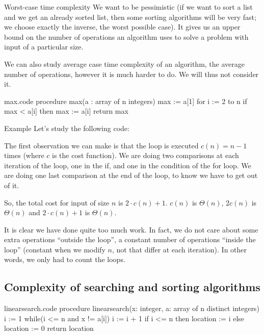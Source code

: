 \documentclass[a4paper]{article}
\begin{document}
\begin{parag}{Worst-case time complexity}
    We want to be pessimistic (if we want to sort a list and we get an already sorted list, then some sorting algorithms will be very fast; we choose exactly the inverse, the worst possible case). It gives us an upper bound on the number of operations an algorithm uses to solve a problem with input of a particular size.

    We can also study average case time complexity of an algorithm, the average number of operations, however it is much harder to do. We will thus not consider it.
\end{parag}

\begin{filecontents*}[overwrite]{max.code}
procedure max(a : array of n integers)
    max := a[1]
    for i := 2 to n
        if max < a[i] then max := a[i]
    return max
\end{filecontents*}

\begin{parag}{Example}
    Let's study the following code:

    The first observation we can make is that the loop is executed $c\left(n\right) = n - 1$ times (where $c$ is the cost function). We are doing two comparisons at each iteration of the loop, one in the if, and one in the condition of the for loop. We are doing one last comparison at the end of the loop, to know we have to get out of it.

    So, the total cost for input of size $n$ is $2\cdot c\left(n\right) + 1$. $c\left(n\right)$ is $\Theta\left(n\right)$, $2c\left(n\right)$ is $\Theta\left(n\right)$ and $2\cdot c\left(n\right) + 1$ is $\Theta\left(n\right)$.

    It is clear we have done quite too much work. In fact, we do not care about some extra operations ``outside the loop'', a constant number of operations ``inside the loop'' (constant when we modify $n$, not that differ at each iteration). In other words, we only had to count the loops.
\end{parag}

\subsection{Complexity of searching and sorting algorithms}
\begin{filecontents*}[overwrite]{linearsearch.code}
procedure linearsearch(x: integer, a: array of n distinct integers)
    i := 1
    while(i <= n and x != a[i])
        i := i + 1
    if i <= n then location := i else location := 0
    return location
\end{filecontents*}
\end{document}
